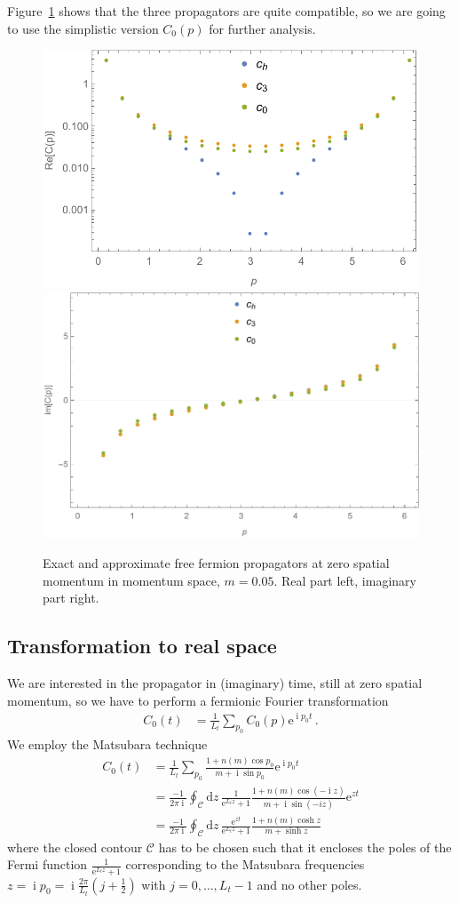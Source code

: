 \documentclass[a4paper]{article}
\DeclareMathOperator{\im}{i}
\newcommand{\eto}[1]{\ensuremath{\mathrm{e}^{#1}}}
\newcommand{\md}{\ensuremath{\mathrm{d}}}
\begin{document}
	Figure~\ref{fig:free_prop_mom_space} shows that the three propagators are quite compatible, so we are going to use the simplistic version $C_0(p)$ for further analysis.

	\begin{figure}[htp]
		\centering
		\includegraphics[width=.45\textwidth]{free-prop_mom-space}
		\includegraphics[width=.45\textwidth]{free-prop_mom-space_im}
		\caption{Exact and approximate free fermion propagators at zero spatial momentum in momentum space, $m=\num{0.05}$. Real part left, imaginary part right.}\label{fig:free_prop_mom_space}
	\end{figure}

	\subsection{Transformation to real space}
	We are interested in the propagator in (imaginary) time, still at zero spatial momentum, so we have to perform a fermionic Fourier transformation
	\begin{align}
	C_0(t)&=\frac{1}{L_t}\sum_{p_0}C_0(p)\eto{\im p_0 t}\,.
	\end{align}
	We employ the Matsubara technique
	\begin{align}
	C_0(t)&=\frac{1}{L_t}\sum_{p_0}\frac{1+n(m)\cos p_0}{m+\im \sin p_0}\eto{\im p_0 t}\\
	&=\frac{-1}{2\pi\im}\oint_\mathcal{C}\md z\, \frac{1}{\eto{L_t z}+1}\frac{1+n(m)\cos(-\im z)}{m+\im \sin (-iz)}\eto{z t}\\
	&=\frac{-1}{2\pi\im}\oint_\mathcal{C}\md z\, \frac{\eto{z t}}{\eto{L_t z}+1}\frac{1+n(m)\cosh z}{m+\sinh z}\label{eq:contour_int_C}
	\end{align}
	where the closed contour $\mathcal{C}$ has to be chosen such that it encloses the poles of the Fermi function $\frac{1}{\eto{L_t z}+1}$ corresponding to the Matsubara frequencies $z=\im p_0=\im\frac{2\pi}{L_t}\left(j+\frac 12\right)$ with $j=0,\dots,L_t-1$ and no other poles.
	
\end{document}
